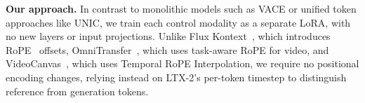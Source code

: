 \textbf{Our approach.}
In contrast to monolithic models such as VACE or unified token approaches like UNIC, we train each control modality as a separate LoRA, with no new layers or input projections. Unlike Flux Kontext~\cite{batifol2025fluxkontext}, which introduces RoPE~\cite{su2021rope} offsets, OmniTransfer~\cite{zhang2026omnitransfer}, which uses task-aware RoPE for video, and VideoCanvas~\cite{cai2025videocanvas}, which uses Temporal RoPE Interpolation, we require no positional encoding changes, relying instead on LTX-2's per-token timestep to distinguish reference from generation tokens.